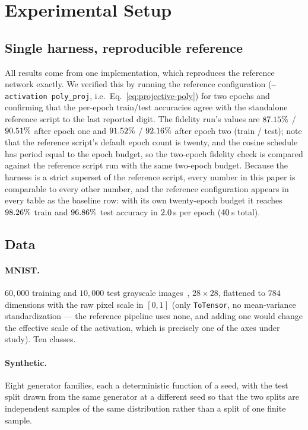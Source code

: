 \section{Experimental Setup}
\label{sec:setup}

\subsection{Single harness, reproducible reference}

All results come from one implementation, which reproduces the reference
network exactly. We verified this by running the reference configuration
(\texttt{--activation poly\_proj}, i.e.\ Eq.~\eqref{eq:projective-poly}) for
two epochs and confirming that the per-epoch train/test accuracies agree with
the standalone reference script to the last reported digit. The fidelity run's
values are $87.15\%$ / $90.51\%$ after epoch one and
$91.52\%$ / $92.16\%$ after epoch two (train / test); note that
the reference script's default epoch count is twenty, and the cosine schedule
has period equal to the epoch budget, so the two-epoch fidelity check is
compared against the reference script run with the same two-epoch budget.
Because the harness is a strict superset of the reference script, every number
in this paper is comparable to every other number, and the reference
configuration appears in every table as the baseline row: with its own
twenty-epoch budget it reaches $98.26\%$ train and $96.86\%$ test
accuracy in $2.0$\,s per epoch ($40$\,s total).

\subsection{Data}

\paragraph{MNIST.} $60{,}000$ training and $10{,}000$ test grayscale
images~\citep{lecun1998gradient},
$28 \times 28$, flattened to $784$ dimensions with the raw pixel scale in
$[0,1]$ (only \texttt{ToTensor}, no mean-variance standardization --- the
reference pipeline uses none, and adding one would change the effective scale
of the activation, which is precisely one of the axes under study). Ten
classes.

\paragraph{Synthetic.} Eight generator families, each a deterministic function
of a seed, with the test split drawn from the same generator at a different
seed so that the two splits are independent samples of the same distribution
rather than a split of one finite sample.

